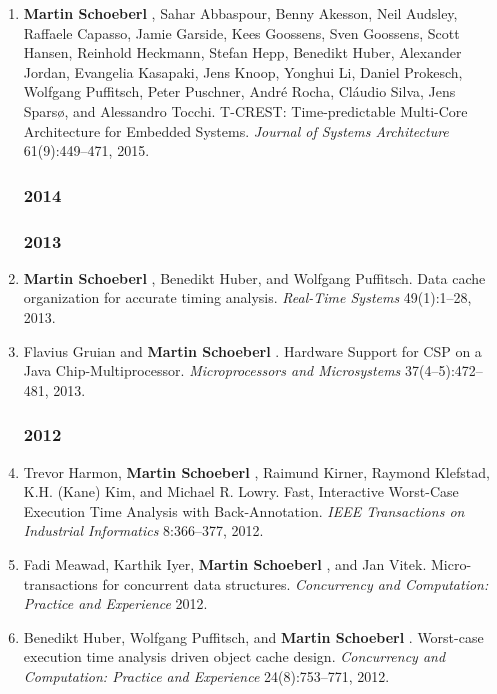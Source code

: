 \begin{enumerate}
\item {\bf Martin Schoeberl }, Sahar Abbaspour, Benny Akesson, Neil Audsley, Raffaele Capasso, Jamie Garside, Kees Goossens, Sven Goossens, Scott Hansen, Reinhold Heckmann, Stefan Hepp, Benedikt Huber, Alexander Jordan, Evangelia Kasapaki, Jens Knoop, Yonghui Li, Daniel Prokesch, Wolfgang Puffitsch, Peter Puschner, Andr\'{e} Rocha, Cl\'{a}udio Silva, Jens Spars{\o}, and Alessandro Tocchi.
 T-CREST: Time-predictable Multi-Core Architecture for Embedded Systems.
 \emph{Journal of Systems Architecture} 61(9):449--471, 2015.


\subsubsection*{2014}


\subsubsection*{2013}

\item {\bf Martin Schoeberl }, Benedikt Huber, and Wolfgang Puffitsch.
 Data cache organization for accurate timing analysis.
 \emph{Real-Time Systems} 49(1):1--28, 2013.

\item Flavius Gruian and {\bf Martin Schoeberl }.
 Hardware Support for CSP on a Java Chip-Multiprocessor.
 \emph{Microprocessors and Microsystems} 37(4--5):472--481, 2013.


\subsubsection*{2012}

\item Trevor Harmon, {\bf Martin Schoeberl }, Raimund Kirner, Raymond Klefstad, K.H. (Kane) Kim, and Michael R. Lowry.
 Fast, Interactive Worst-Case Execution Time Analysis with Back-Annotation.
 \emph{IEEE Transactions on Industrial Informatics} 8:366--377, 2012.

\item Fadi Meawad, Karthik Iyer, {\bf Martin Schoeberl }, and Jan Vitek.
 Micro-transactions for concurrent data structures.
 \emph{Concurrency and Computation: Practice and Experience} 2012.

\item Benedikt Huber, Wolfgang Puffitsch, and {\bf Martin Schoeberl }.
 Worst-case execution time analysis driven object cache design.
 \emph{Concurrency and Computation: Practice and Experience} 24(8):753--771, 2012.


\end{enumerate}
